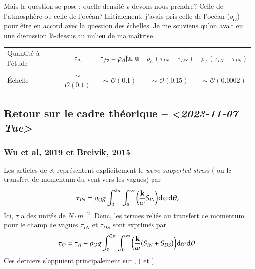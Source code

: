 \documentclass[10pt]{article}
\numberwithin{equation}{section}
\newcommand{\uu}{\vb{u}}
\newcommand{\pt}{\hspace{1pt}} %
\begin{document}
Mais la question se pose : quelle densité \(\rho\) devons-nous prendre? Celle de l'atmosphère ou celle de l'océan?
Initialement, j'avais pris celle de l'océan (\(\rho_O\)) pour être en accord avec la question des échelles.
Je me souviens qu'on avait eu une discussion là-dessus au milieu de ma maîtrise.

\begin{center}
\begin{tabular}{l|cccc}
\hline
\hline
Quantité à l'étude & \(\tau\)\textsubscript{A} & \(\tau_{fv} = \rho_A\abs{\uu_*}\uu\) & \(\rho_O(\tau_{IN} - \tau_{DS})\) & \(\rho_A(\tau_{IN} - \tau_{IN})\)\\[0pt]
Échelle & \(\sim\) \(\mathscr{O}(0.1)\) & \(\sim\) \(\mathscr{O}(0.1)\) & \(\sim\) \(\mathscr{O}(0.15)\) & \(\sim\) \(\mathscr{O}(0.0002)\)\\[0pt]
\hline
\hline
\end{tabular}
\end{center}

\subsection{Retour sur le cadre théorique -- \textit{<2023-11-07 Tue>}}
\label{sec:orge4fb002}

\subsubsection{Wu et al, 2019 et Breivik, 2015}
\label{sec:org6cf5d45}

Les articles de \citet*{wu_breivik_2019} et \citet{breivik_al_2015} représentent explicitement le \emph{wave-supported stress} ( ou le transfert de momentum du vent vers les vagues) par
\begin{equation}
   \boldsymbol{\tau}_{IN} = \rho_O g \int_0^{2\pi} \int_0^{\pt\infty} \qty(\frac{\vb{k}}{\omega} S_{IN} )\pt\mathrm{d}\omega\pt \mathrm{d} \theta,
\end{equation}
Ici, \(\tau\) a des unités de \(N\cdot m^{-2}\).
Donc, les termes reliés au transfert de momentum pour le champ de vagues \(\tau_{IN}\) et \(\tau_{DS}\) sont exprimés par
\begin{equation}
   \boldsymbol{\tau}_{O} = \boldsymbol{\tau}_A - \rho_O g \int_0^{2\pi} \int_0^{\pt\infty} \qty( \frac{\vb{k}}{\omega} \qty(S_{IN} + S_{DS}) )\pt\mathrm{d}\omega\pt \mathrm{d} \theta.
\end{equation}
Ces derniers s'appuient principalement sur , \citeauthor[voir][]{janssen_1989} (\citeyear{janssen_1989} et \citeyear{janssen_1991}).
\end{document}
